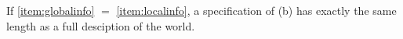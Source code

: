 \documentclass[letterpaper]{article} %
\theoremstyle{plain}
\theoremstyle{definition}
\theoremstyle{remark}
\begin{document}
If \ref{item:globalinfo} $=$ \ref{item:localinfo},
a specification of (b) has
 exactly the same length as a full desciption of the world. 
\end{document}
